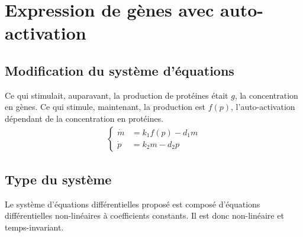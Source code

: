 \documentclass[a4paper, 12pt]{article}
\begin{document}

	\section{Expression de gènes avec auto-activation}
	\subsection{Modification du système d'équations}
	Ce qui stimulait, auparavant, la production de protéines était $g$, la concentration en gènes. Ce qui stimule, maintenant, la production est $f(p)$, l'auto-activation dépendant de la concentration en protéines.
	\begin{align}
		\left\{
		\begin{aligned}
			\dot{m} & = {k}_{1}{f}(p) - {d}_{1}m \\
			\dot{p} & = {k}_{2}m - {d}_{2}p
		\end{aligned}
		\right.
	\end{align}
	\subsection{Type du système}
	Le système d'équations différentielles proposé est composé d'équations différentielles non-linéaires à coefficients constants. Il est donc non-linéaire et temps-invariant.
\end{document}

